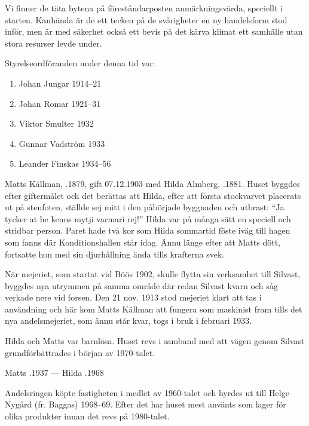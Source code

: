 Vi finner de täta bytena på föreståndarposten anmärkningsvärda, speciellt i starten. Kanhända är de ett tecken på de svårigheter en ny handelsform stod inför, men är med säkerhet också ett bevis på det kärva klimat ett samhälle utan stora resurser levde under.

Styrelseordföranden under denna tid var:
\begin{enumerate}
  \item Johan Jungar     1914--21
  \item Johan Romar      1921--31
  \item Viktor Smulter   1932
  \item Gunnar Vadström  1933
  \item Leander Finskas  1934--56
\end{enumerate}





Matts Källman, .1879, gift 07.12.1903 med Hilda Almberg, .1881. Huset byggdes efter giftermålet och det berättas att Hilda, efter att första stockvarvet placerats ut på stenfoten, ställde sej mitt i den påbörjade byggnaden och utbrast: ``Ja tycker at he kenns mytji varmari rej!'' Hilda var på många sätt en speciell och stridbar person. Paret hade två kor som Hilda sommartid föste iväg till hagen som fanns där Konditionshallen står idag. Ännu länge efter att Matts dött, fortsatte hon med sin djurhållning ända tills krafterna svek.

När mejeriet, som startat vid Böös 1902, skulle flytta sin verksamhet till Silvast, byggdes nya utrymmen på samma område där redan Silvast kvarn och såg verkade nere vid forsen. Den 21 nov. 1913 stod mejeriet klart att tas i användning och här kom Matts Källman att fungera som maskinist fram tills det nya andelsmejeriet, som ännu står kvar, togs i bruk i februari 1933.

Hilda och Matts var barnlösa. Huset revs i samband med att vägen genom Silvast grundförbättrades i början av 1970-talet.

Matts .1937  ---  Hilda .1968





Andelsringen köpte fastigheten i medlet av 1960-talet och hyrdes ut till Helge Nygård (fr. Baggas) 1968--69. Efter det har huset mest använts som lager för olika produkter innan det revs på 1980-talet.


